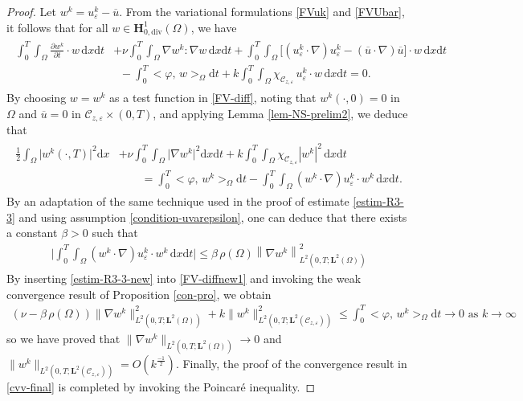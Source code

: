 \documentclass[a4paper,12pt,reqno,natbib]{amsart}
\newcommand{\dx} {\displaystyle\mathrm{d}x}
\newcommand{\dt} {\displaystyle\mathrm{d}t}
\def\H{\textbf{H}}
\def\L{\textbf{L}}
\begin{document}
\begin{proof}
Let \( w^k = u^k_\varepsilon - \overline{u} \). From the variational formulations \eqref{FVuk} and \eqref{FVUbar}, it follows that for all \( w \in \H^1_{0,\mathrm{div}}(\Omega) \), we have
 \begin{align}
\begin{split}\label{FV-diff}
    \int_0^T\int_\Omega\frac{\partial w^k}{\partial t}\cdot w \,\dx\dt&+\nu\int_0^T\int_\Omega\nabla w^k:\nabla w \,\dx\dt+\int_0^T\int_\Omega\big[(u^k_\varepsilon\cdot\nabla) u^k_\varepsilon-(\overline{u}\cdot\nabla) \overline{u}\big]\cdot w \,\dx\dt\\
    &\;\;-   \int_0^T\big<\varphi,\,w \big>_\Omega\dt+k\int_0^T\int_\Omega\chi_{\mathcal{C}_{z,\varepsilon}}\,u_\varepsilon^k\cdot w \,\dx\dt=0.
    \end{split}
\end{align}
By choosing \( w = w^k \) as a test function in \eqref{FV-diff}, noting that \( w^k(\cdot,0) = 0 \) in \( \Omega \) and \( \overline{u} = 0 \) in \( \mathcal{C}_{z,\varepsilon} \times (0,T) \), and applying Lemma \ref{lem-NS-prelim2}, we deduce that
 \begin{align}
\begin{split}\label{FV-diffnew1}
    \frac{1}{2}\int_\Omega\big|w^k(\cdot,T)\big|^2\dx&+\nu\int_0^T\int_\Omega\big|\nabla w^k\big|^2\dx\dt+k\int_0^T\int_\Omega\chi_{\mathcal{C}_{z,\varepsilon}}|w^k|^2 \,\dx\dt\\
    &\qquad=  \int_0^T\big<\varphi,\,w^k \big>_\Omega\dt-\int_0^T\int_\Omega (w^k\cdot\nabla) u^k_\varepsilon\cdot w^k \,\dx\dt.
    \end{split}
\end{align}
By an adaptation of the same technique used in the proof of estimate \eqref{estim-R3-3} and using assumption \eqref{condition-uvarepsilon}, one can deduce that there exists a constant \( \beta > 0 \) such that
\begin{align}\label{estim-R3-3-new}
        \big| \int_0^T \int_\Omega (w^k \cdot \nabla) u_\varepsilon^k \cdot w^k \, \dx\dt \big|  
        \leq \beta\, \rho(\Omega)  \left\|\nabla w^k\right\|^2_{L^2(0,T;\L^2(\Omega))}
    \end{align}
By inserting \eqref{estim-R3-3-new} into \eqref{FV-diffnew1} and invoking the weak convergence result of Proposition \ref{con-pro}, we obtain
\begin{align*}
   (\nu-\beta \, \rho(\Omega))\big\|\nabla w^k\big\|^2_{L^2(0,T;\L^2(\Omega))}+k\big\|w^k\big\|^2_{L^2(0,T;\L^2(\mathcal{C}_{z,\varepsilon}))}\leq  \int_0^T\big<\varphi,\,w^k \big>_\Omega\dt\longrightarrow0\text{ as } k\to\infty
\end{align*}
so we have proved that $\big\|\nabla w^k\big\|_{L^2(0,T;\L^2(\Omega))}\longrightarrow0$ and $\big\|w^k\big\|_{L^2(0,T;\L^2(\mathcal{C}_{z,\varepsilon}))}=O({k}^{\frac{-1}{2}}).$ Finally, the proof of the convergence result in \eqref{cvv-final} is completed by invoking the Poincar\'e inequality.    
\end{proof}
\end{document}
